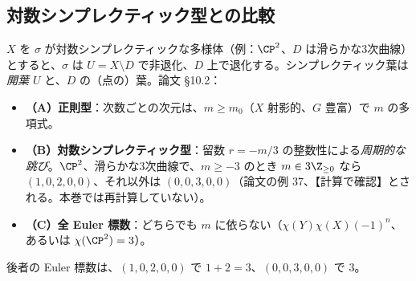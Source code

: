 \subsection{対数シンプレクティック型との比較}
$X$ を $\sigma$ が対数シンプレクティックな多様体（例：$\CP^2$、$D$ は滑らかな3次曲線）とすると、$\sigma$ は $U=X\setminus D$ で非退化、$D$ 上で退化する。シンプレクティック葉は\emph{開葉 $U$} と、$D$ の（点の）葉。論文 \S10.2：
\begin{itemize}
\item \textbf{（A）正則型}：次数ごとの次元は、$m\ge m_0$（$X$ 射影的、$G$ 豊富）で $m$ の多項式。
\item \textbf{（B）対数シンプレクティック型}：留数 $r=-m/3$ の整数性による\emph{周期的な跳び}。$\CP^2$、滑らかな3次曲線で、$m\ge-3$ のとき $m\in3\Z_{\ge0}$ なら $(1,0,2,0,0)$、それ以外は $(0,0,3,0,0)$（論文の例 37、【計算で確認】とされる。本巻では再計算していない）。
\item \textbf{（C）全 Euler 標数}：どちらでも $m$ に依らない（$\chi(Y)\chi(X)(-1)^n$、あるいは $\chi(\CP^2)=3$）。
\end{itemize}
後者の Euler 標数は、$(1,0,2,0,0)$ で $1+2=3$、$(0,0,3,0,0)$ で $3$。
